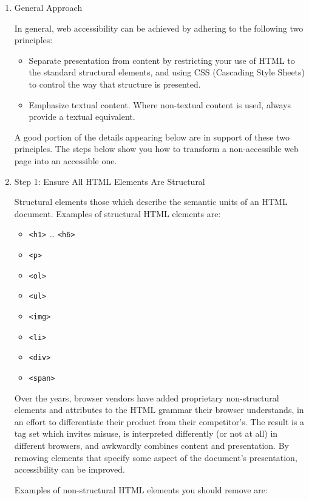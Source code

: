 \documentclass{article}
\begin{document}
\begin{enumerate}
\item General Approach
\label{sec:orgheadline279}

In general, web accessibility can be achieved by adhering to the
following two principles:

\begin{itemize}
\item Separate presentation from content by restricting your use of HTML to
the standard structural elements, and using CSS (Cascading Style
Sheets) to control the way that structure is presented.
\item Emphasize textual content. Where non-textual content is used, always
provide a textual equivalent.
\end{itemize}

A good portion of the details appearing below are in support of these
two principles. The steps below show you how to transform a
non-accessible web page into an accessible one.

\item Step 1: Ensure All HTML Elements Are Structural
\label{sec:orgheadline280}

Structural elements those which describe the semantic units of an HTML
document. Examples of structural HTML elements are:

\begin{itemize}
\item \texttt{<h1>} \ldots{} \texttt{<h6>}
\item \texttt{<p>}
\item \texttt{<ol>}
\item \texttt{<ul>}
\item \texttt{<img>}
\item \texttt{<li>}
\item \texttt{<div>}
\item \texttt{<span>}
\end{itemize}

Over the years, browser vendors have added proprietary non-structural
elements and attributes to the HTML grammar their browser understands,
in an effort to differentiate their product from their competitor's. The
result is a tag set which invites misuse, is interpreted differently (or
not at all) in different browsers, and awkwardly combines content and
presentation. By removing elements that specify some aspect of the
document's presentation, accessibility can be improved.

Examples of non-structural HTML elements you should remove are:


\end{enumerate}
\end{document}
